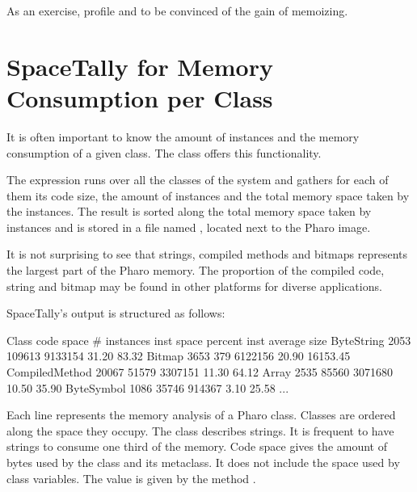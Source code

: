\documentclass[a4paper,10pt,twoside]{book}
\begin{document}

As an exercise, profile  and  to be convinced of the gain of memoizing. 

\section{SpaceTally for Memory Consumption per Class}

It is often important to know the amount of instances and the memory consumption of a given class. The class  offers this functionality. 

The expression  runs over all the classes of the system and gathers for each of them its code size, the amount of instances and the total memory space taken by the instances. The result is sorted along the total memory space taken by instances and is stored in a file named , located next to the Pharo image. 

It is not surprising to see that strings, compiled methods and bitmaps represents the largest part of the Pharo memory. The proportion of the compiled code, string and bitmap may be found in other platforms for diverse applications. 

SpaceTally's output is structured as follows:

\begin{code}{}
Class                            code space # instances  inst space     percent   inst average size
ByteString                           2053      109613        9133154       31.20               83.32
Bitmap                                 3653            379       6122156       20.90          16153.45
CompiledMethod                 20067      51579       3307151       11.30                64.12
Array                                   2535         85560       3071680      10.50                 35.90
ByteSymbol                        1086         35746         914367        3.10                 25.58
...
\end{code}

Each line represents the memory analysis of a Pharo class. Classes are ordered along the space they occupy. The class  describes strings. It is frequent to have strings to consume one third of the memory.
Code space gives the amount of bytes used by the class and its metaclass. It does not include the space used by class variables. The value is given by the method . 
\end{document}
